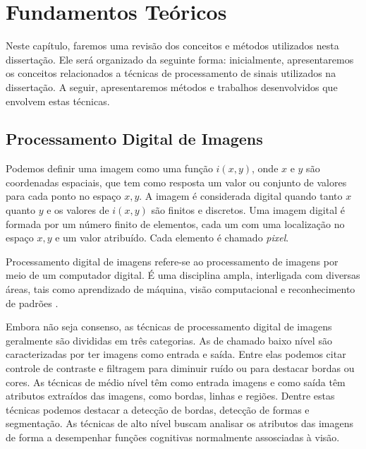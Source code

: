 \chapter{Fundamentos Teóricos} \label{funt}

Neste capítulo, faremos uma revisão dos conceitos e métodos utilizados nesta dissertação. Ele será organizado da seguinte forma: inicialmente, apresentaremos os conceitos relacionados a técnicas de processamento de sinais utilizados na dissertação. A seguir, apresentaremos métodos e trabalhos desenvolvidos que envolvem estas técnicas.

\section{Processamento Digital de Imagens} \label{funt:proc}

Podemos definir uma imagem como uma função $i(x,y)$, onde $x$ e $y$ são coordenadas espaciais, que tem como resposta um valor ou conjunto de valores para cada ponto no espaço $x,y$. A imagem é considerada digital quando tanto $x$ quanto $y$ e os valores de $i(x,y)$ são finitos e discretos. Uma imagem digital é formada por um número finito de elementos, cada um com uma localização no espaço $x,y$ e um valor atribuído. Cada elemento é chamado \textit{pixel}.

Processamento digital de imagens refere-se ao processamento de imagens por meio de um computador digital. É uma disciplina ampla, interligada com diversas áreas, tais como aprendizado de máquina, visão computacional e reconhecimento de padrões \cite{gonzales}.


Embora não seja consenso, as técnicas de processamento digital de imagens geralmente são divididas em três categorias. As de chamado baixo nível são caracterizadas por ter imagens como entrada e saída. Entre elas podemos citar controle de contraste e filtragem para diminuir ruído ou para destacar bordas ou cores. As técnicas de médio nível têm como entrada imagens e como saída têm atributos extraídos das imagens, como bordas, linhas e regiões. Dentre estas técnicas podemos destacar a detecção de bordas, detecção de formas e segmentação. As técnicas de alto nível buscam analisar os atributos das imagens de forma a desempenhar funções cognitivas normalmente assosciadas à visão.

